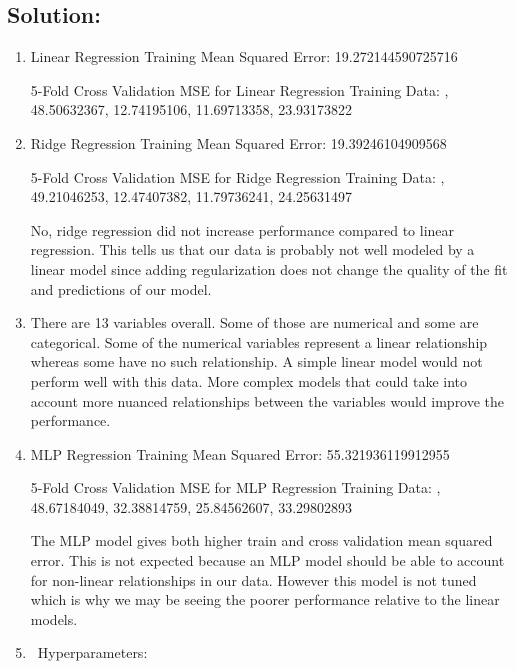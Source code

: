 \documentclass[submit]{harvardml}
\begin{document}
\subsection*{Solution:}
 \begin{enumerate}
     \item 
     Linear Regression Training Mean Squared Error: 19.272144590725716
     
    5-Fold Cross Validation MSE for Linear Regression Training Data: , 48.50632367, 12.74195106, 11.69713358, 23.93173822
     \item
     Ridge Regression Training Mean Squared Error: 19.39246104909568

    5-Fold Cross Validation MSE for Ridge Regression Training Data: , 49.21046253, 12.47407382, 11.79736241, 24.25631497
    
    No, ridge regression did not increase performance compared to linear regression. This tells us that our data is probably not well modeled by a linear model since adding regularization does not change the quality of the fit and predictions of our model.
    
    \item
    There are 13 variables overall. Some of those are numerical and some are categorical. Some of the numerical variables represent a linear relationship whereas some have no such relationship. A simple linear model would not perform well with this data. More complex models that could take into account more nuanced relationships between the variables would improve the performance.
    
    \item
    MLP Regression Training Mean Squared Error: 55.321936119912955
    
    5-Fold Cross Validation MSE for MLP Regression Training Data: , 48.67184049, 32.38814759, 25.84562607, 33.29802893
    
    The MLP model gives both higher train and cross validation mean squared error. This is not expected because an MLP model should be able to account for non-linear relationships in our data. However this model is not tuned which is why we may be seeing the poorer performance relative to the linear models.
    
    \item\
    Hyperparameters:
    

\end{enumerate}
\end{document}
